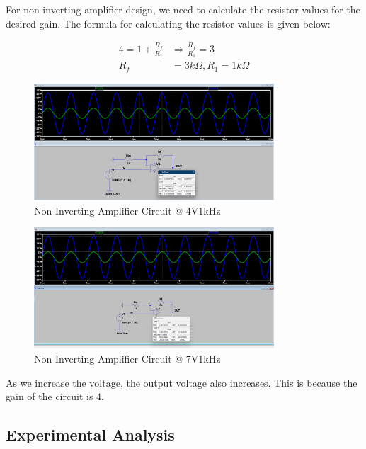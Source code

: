 For non-inverting amplifier design, we need to calculate the resistor values for the desired gain. The formula for calculating the resistor values is given below:

\begin{align*}
    4 = 1 + \frac{R_{f}}{R_{1}} &\Rightarrow \frac{R_{f}}{R_{1}} = 3 \\
    R_{f} &= 3k\Omega, R_{1} = 1k\Omega
\end{align*}

\begin{figure}[h]
    \centering
    \includegraphics[width=0.8\textwidth]{assets/a4_design.png}
    \caption{Non-Inverting Amplifier Circuit @ 4V1kHz}
    \label{fig:non-inverting-amplifier-circuit-4v}
\end{figure}

\begin{figure}[h]
    \centering
    \includegraphics[width=0.8\textwidth]{assets/7_design.png}
    \caption{Non-Inverting Amplifier Circuit @ 7V1kHz}
    \label{fig:non-inverting-amplifier-circuit-7v}
\end{figure}

As we increase the voltage, the output voltage also increases. This is because the gain of the circuit is $4$.

\newpage
\thispagestyle{plain}

\subsection{Experimental Analysis}

